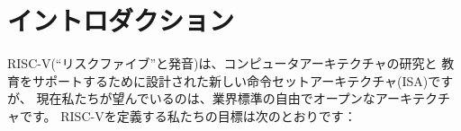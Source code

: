 \begin{comment}
\chapter{Introduction}
\end{comment}
\chapter{イントロダクション}

\begin{comment}
RISC-V (pronounced ``risk-five'') is a new instruction-set
architecture (ISA) that was originally designed to support computer
architecture research and education, but which we now hope will also
become a standard free and open architecture for industry
implementations.  Our goals in defining RISC-V include:
\end{comment}
RISC-V(``リスクファイブ''と発音)は、コンピュータアーキテクチャの研究と
教育をサポートするために設計された新しい命令セットアーキテクチャ(ISA)ですが、
現在私たちが望んでいるのは、業界標準の自由でオープンなアーキテクチャです。
RISC-Vを定義する私たちの目標は次のとおりです：

